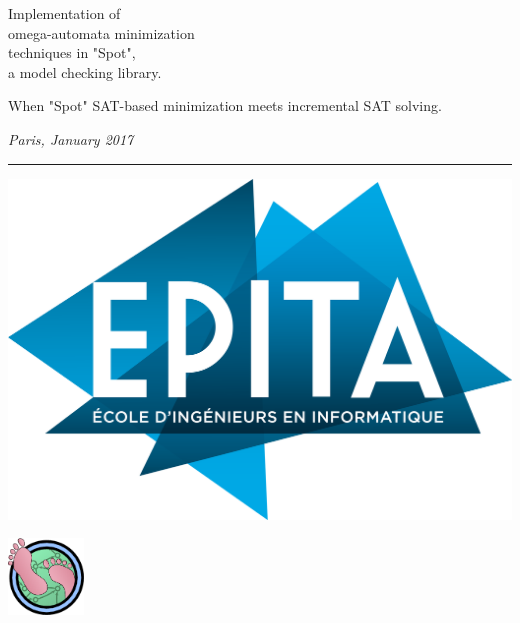 \begin{titlepage}
\noindent \titlefont Implementation of\\
omega-automata minimization\\
techniques in "Spot", \\
a model checking library.\par
\epigraph{When "Spot" SAT-based minimization meets incremental SAT solving.}%
{\textit{Paris, January 2017}}
\null\vfill
\vspace*{1cm}
\noindent
\hfill%
%
\noindent\begin{minipage}{0.7\textwidth}
    \begin{flushright}
        \printauthor
    \end{flushright}
\end{minipage}%
%
\begin{minipage}{0.1\linewidth}%
  \hspace{0.5cm}%
  \rule{5pt}{200pt}%
\end{minipage}%
%
\begin{minipage}{0.3\textwidth}%
  \includegraphics[width=\linewidth]{./img/epita.png} \\%
  \begin{center}%
    \includegraphics[width=2cm]{./img/spot.png}%
  \end{center}%

\end{minipage}
\end{titlepage}
